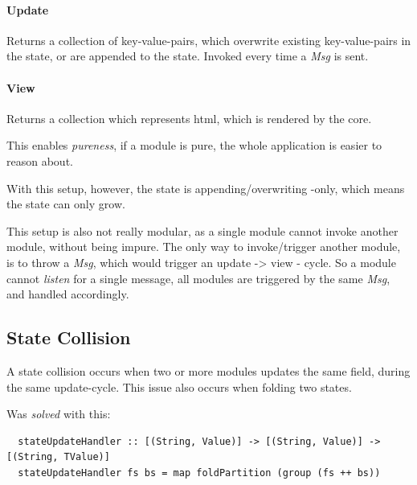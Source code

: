 \paragraph{Update} Returns a collection of key-value-pairs, which
overwrite existing key-value-pairs in the state, or are appended to the state.
Invoked every time a \textit{Msg} is sent.

\paragraph{View} Returns a collection which represents \gls{html},
which is rendered by the core.

This enables \textit{pureness}, if a module is pure, the whole application is
easier to reason about.

With this setup, however, the state is appending/overwriting -only, which means
the state can only grow.

This setup is also not really modular, as a single module cannot invoke another
module, without being impure. The only way to invoke/trigger another module, is
to throw a \textit{Msg}, which would trigger an update -> view - cycle. So
a module cannot \textit{listen} for a single message, all modules are triggered
by the same \textit{Msg}, and handled accordingly.

\begin{center}
  
\end{center}



\begin{center}
  
\end{center}

\subsection{State Collision}

A state collision occurs when two or more modules updates the same field, during
the same update-cycle. This issue also occurs when folding two states.


Was \textit{solved} with this:

\begin{verbatim}
  stateUpdateHandler :: [(String, Value)] -> [(String, Value)] -> [(String, TValue)]
  stateUpdateHandler fs bs = map foldPartition (group (fs ++ bs))
\end{verbatim}

